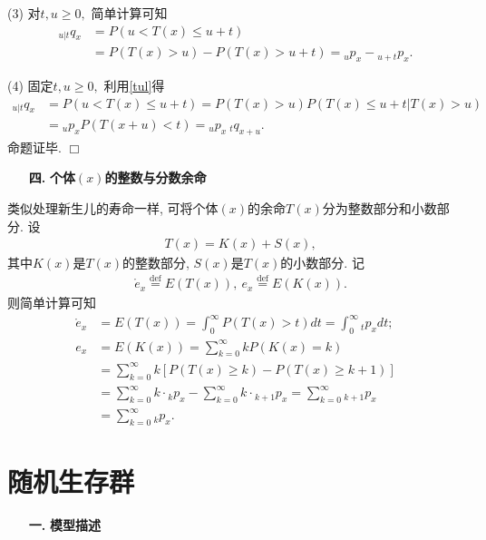 \documentclass[a4paper,openany, 10pt]{ctexbook}
\newcommand{\hei}{\CJKfamily{hei}}      %
\def\qed{\hfill$\Box$\medskip}
\begin{document}
(3) 对$t,u\ge0,$ 简单计算可知
\begin{align*}
    {}_{u|t}q_x & =P(u<T(x)\leq u+t)                          \\
                & =P(T(x)>u)-P(T(x)>u+t)={}_up_x-{}_{u+t}p_x.
\end{align*}

(4) 固定$t,u\ge0,$ 利用\eqref{tul}得
\begin{align*}
    {}_{u|t}q_x & =P(u<T(x)\leq u+t)=P(T(x)>u)P(T(x)\leq u+t|T(x)>u) \\
                & ={}_up_xP(T(x+u)<t)= {}_up_x{}~_{t}q_{x+u}.
\end{align*}
命题证毕. \qed

\begin{itemize}
    \item[{\bf\hei 四.}]{\bf\hei 个体$(x)$的整数与分数余命}
\end{itemize}
类似处理新生儿的寿命一样, 可将个体$(x)$的余命$T(x)$分为整数部分和小数部分.
设
\begin{align*}
     & T(x)=K(x)+S(x),
\end{align*}
其中$K(x)$是$T(x)$的整数部分, $S(x)$是$T(x)$的小数部分. 记
\begin{align*}
     & \mathring{e}_x\stackrel{\text{def}}{=}E(T(x)), \   {e_x}\stackrel{\text{def}}{=}E(K(x)).
\end{align*}
则简单计算可知 \begin{align*}
    \mathring{e}_x & =E(T(x))=\int_{0}^{\infty}P(T(x)>t)d t=\int_{0}^{\infty}{_tp_xdt};                          \\
    {e_x}          & =E(K(x))=\sum_{k=0}^{\infty}kP(K(x)=k)                                                      \\
                   & =\sum_{k=0}^{\infty}k[P(T(x)\geq k)-P(T(x)\geq k+1)]                                        \\
                   & =\sum_{k=0}^{\infty}k\cdot{}_kp_x-\sum_{k=0}^{\infty}k\cdot{}_{k+1}p_x=\sum_{k=0}^{\infty}{_{k+1}p_x} \\
                   & =\sum_{k=0}^{\infty}{_kp_x}.
\end{align*}

\section{随机生存群}
\begin{itemize}
    \item[{\bf\hei 一.}]{\bf\hei 模型描述}
\end{itemize}
\end{document}
